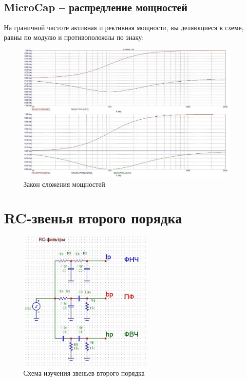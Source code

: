 \documentclass[a4paper, 12pt]{article}
\begin{document}
\subsection*{MicroCap -- распредление мощностей}
На граничной частоте активная и рективная мощности, вы деляющиеся в схеме, равны по модулю и противоположны по знаку:
\begin{figure}[H]
\centering
\includegraphics[width=1\textwidth]{rcpowe}
\caption{Закон сложения мощностей}
\end{figure}

\section*{RC-звенья второго порядка}
\begin{figure}[H]
\centering
\includegraphics[width=0.6\textwidth]{rcpole}
\caption{Схема изучения звеньев второго порядка}
\end{figure}
\end{document}

